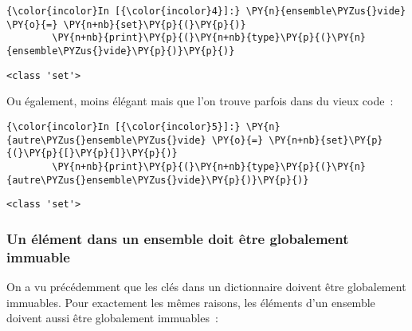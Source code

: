     \begin{Verbatim}[commandchars=\\\{\}]
{\color{incolor}In [{\color{incolor}4}]:} \PY{n}{ensemble\PYZus{}vide} \PY{o}{=} \PY{n+nb}{set}\PY{p}{(}\PY{p}{)}
        \PY{n+nb}{print}\PY{p}{(}\PY{n+nb}{type}\PY{p}{(}\PY{n}{ensemble\PYZus{}vide}\PY{p}{)}\PY{p}{)}
\end{Verbatim}


    \begin{Verbatim}[commandchars=\\\{\}]
<class 'set'>

    \end{Verbatim}

    Ou également, moins élégant mais que l'on trouve parfois dans du vieux
code~:

    \begin{Verbatim}[commandchars=\\\{\}]
{\color{incolor}In [{\color{incolor}5}]:} \PY{n}{autre\PYZus{}ensemble\PYZus{}vide} \PY{o}{=} \PY{n+nb}{set}\PY{p}{(}\PY{p}{[}\PY{p}{]}\PY{p}{)}
        \PY{n+nb}{print}\PY{p}{(}\PY{n+nb}{type}\PY{p}{(}\PY{n}{autre\PYZus{}ensemble\PYZus{}vide}\PY{p}{)}\PY{p}{)}
\end{Verbatim}


    \begin{Verbatim}[commandchars=\\\{\}]
<class 'set'>

    \end{Verbatim}

    \hypertarget{un-uxe9luxe9ment-dans-un-ensemble-doit-uxeatre-globalement-immuable}{%
\subsubsection{Un élément dans un ensemble doit être globalement
immuable}\label{un-uxe9luxe9ment-dans-un-ensemble-doit-uxeatre-globalement-immuable}}

    On a vu précédemment que les clés dans un dictionnaire doivent être
globalement immuables. Pour exactement les mêmes raisons, les éléments
d'un ensemble doivent aussi être globalement immuables~:

    \begin{Shaded}
\begin{Highlighting}[]
\OperatorTok{>>>}\OperatorTok{=}\NormalTok{ \{(}\NormalTok{, }\NormalTok{, [}\NormalTok{, }\NormalTok{])\}}
\NormalTok{, } \OperatorTok{<}\OperatorTok{>}
\NormalTok{: }
\end{Highlighting}
\end{Shaded}

